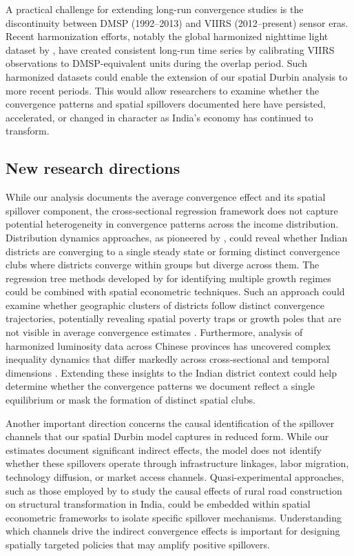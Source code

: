 \documentclass[
  a4paper, 
  twoside,
  review
]{article}
\begin{document}
A practical challenge for extending long-run convergence studies is the
discontinuity between DMSP (1992--2013) and VIIRS (2012--present) sensor
eras. Recent harmonization efforts, notably the global harmonized
nighttime light dataset by \citet{li_etal_harmonization}, have created
consistent long-run time series by calibrating VIIRS observations to
DMSP-equivalent units during the overlap period. Such harmonized
datasets could enable the extension of our spatial Durbin analysis to
more recent periods. This would allow researchers to examine whether the
convergence patterns and spatial spillovers documented here have
persisted, accelerated, or changed in character as India's economy has
continued to transform.

\subsection{New research directions}\label{new-research-directions}

While our analysis documents the average convergence effect and its
spatial spillover component, the cross-sectional regression framework
does not capture potential heterogeneity in convergence patterns across
the income distribution. Distribution dynamics approaches, as pioneered
by \citet{quah_twin_peaks}, could reveal whether Indian districts are
converging to a single steady state or forming distinct convergence
clubs where districts converge within groups but diverge across them.
The regression tree methods developed by
\citet{durlauf_johnson_convergence_clubs} for identifying multiple
growth regimes could be combined with spatial econometric techniques.
Such an approach could examine whether geographic clusters of districts
follow distinct convergence trajectories, potentially revealing spatial
poverty traps or growth poles that are not visible in average
convergence estimates \citep{rey_spatial_dynamics}. Furthermore,
analysis of harmonized luminosity data across Chinese provinces has
uncovered complex inequality dynamics that differ markedly across
cross-sectional and temporal dimensions
\citep{glawe_mendez_china_luminosity}. Extending these insights to the
Indian district context could help determine whether the convergence
patterns we document reflect a single equilibrium or mask the formation
of distinct spatial clubs.

Another important direction concerns the causal identification of the
spillover channels that our spatial Durbin model captures in reduced
form. While our estimates document significant indirect effects, the
model does not identify whether these spillovers operate through
infrastructure linkages, labor migration, technology diffusion, or
market access channels. Quasi-experimental approaches, such as those
employed by \citet{asher_novosad_rural_roads} to study the causal
effects of rural road construction on structural transformation in
India, could be embedded within spatial econometric frameworks to
isolate specific spillover mechanisms. Understanding which channels
drive the indirect convergence effects is important for designing
spatially targeted policies that may amplify positive spillovers.
\end{document}
